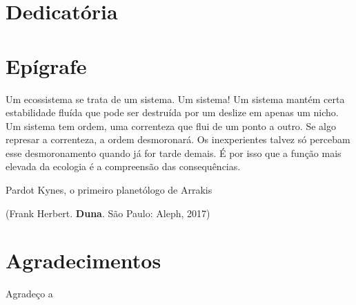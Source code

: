 \documentclass[a4paper, 12pt]{article}
\begin{document}
\section*{Dedicatória}
 \thispagestyle{plain}
{\raggedleft\vfill\itshape{}\par
}
\newpage

\section*{Epígrafe}
\thispagestyle{plain}
\vfill
 
Um ecossistema se trata de um sistema. Um sistema!
Um sistema mantém certa estabilidade fluída que pode ser destruída por um deslize em apenas um nicho.
Um sistema tem ordem, uma correnteza que flui de um ponto a outro.
Se algo represar a correnteza, a ordem desmoronará.
Os inexperientes talvez só percebam esse desmoronamento quando já for tarde demais.
É por isso que a função mais elevada da ecologia é a compreensão das consequências.

\begin{flushright}
Pardot Kynes, o primeiro planetólogo de Arrakis

(Frank Herbert. \textbf{Duna}. São Paulo: Aleph, 2017)
\end{flushright}
\newpage

\section*{Agradecimentos}
 \thispagestyle{plain}
Agradeço a
\newpage

\tableofcontents
\newpage

\newrefsection
\thispagestyle{plain}

\begin{singlespace}
\maketitle
\end{singlespace}
\newpage
\end{document}
